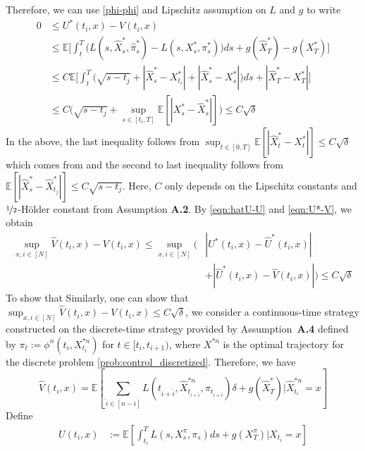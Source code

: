\documentclass{article}
\numberwithin{equation}{section}
\begin{document}
Therefore, we can use \eqref{phi-phi} and Lipschitz assumption on $L$ and $g$ to write
\begin{equation}\label{eqn:U*-V}
    \begin{split}
        0&\le {U}^*(t_{i},x) -V(t_{i},x)\\
        &\le \mathbb{E}\bigg[ \int_t^T \!\!\!\!\!\big(L(s,\hat{X}^*_{s},\hat{\pi}^*_s)-L(s,{X}^*_{s},{\pi}^*_s)\big)ds + g(\hat{X}_T^{*})- g({X}_T^{*})  \bigg] \\
        &\le C\mathbb{E}\bigg[ \int_t^T \big(\sqrt{s-t_j}+|\hat{X}^*_{s}-{X}^*_{t_i}|+|\hat{X}^*_{s}-{X}^*_{s}|\big)ds 
        + |\hat{X}_T^{*} - {X}_T^{*}|  \bigg]\\
        &\le C \big(\sqrt{s-t_j}+\sup_{s\in[t_i,T]}\mathbb{E}[|X^*_{s}-\hat{X}^*_{s}|]\big)\le C\sqrt{\delta}
    \end{split}
\end{equation}
In the above, the last inequality follows from $\sup_{t\in[0,T]}\mathbb{E}[|\hat{X}^*_{t}-{X}^*_{t}|]\le C\sqrt{\delta}$ which comes from \citet[Theorem~9.6.2]{KP13} and the second to last inequality follows from $\mathbb{E}[|\hat{X}^*_{s}-\hat{X}^*_{t_{j}}|]\le C\sqrt{s-t_j}$. 
Here, $C$ only depends on the Lipschitz constants and $\nicefrac{1}{2}$-Hölder constant from Assumption \textbf{A.2}. By \eqref{eqn:hatU-U} and \eqref{eqn:U*-V}, we obtain
\begin{equation}
    \begin{split}
        \sup_{x, i\in[N]}\hat{V}(t_{i},x)-{V}(t_{i},x)\le  \sup_{x, i\in[N]} \big(&|U^*(t_{i},x)-\hat{U}^*(t_{i},x)|\\
        &+|\hat{U}^*(t_{i},x)-\hat{V}(t_{i},x)|\big) \le C\sqrt{\delta}
    \end{split}
\end{equation}
To show that 
Similarly, one can show that $\sup_{x, i\in[N]}\hat{V}(t_{i},x)-{V}(t_{i},x)\le C\sqrt{\delta}$, we consider a continuous-time strategy constructed on the discrete-time strategy provided by Assumption~\textbf{A.4} defined by 
$\pi_t:=\phi^n(t_i,X^{*n}_{t_i})$ for $t\in[t_i,t_{i+1})$, where $X^{*n}$ is the optimal trajectory for the discrete problem \eqref{prob:control_discretized}. Therefore, we have 
\begin{equation}
    \hat{V}(t_i,x)=\mathbb{E}\left[\sum_{\hat{i}\in[n-i]}L(t_{i+\hat{i}},\hat{X}^{*n}_{t_{i+\hat{i}}},{\pi}_{t_{i+\hat{i}}})\delta + g(\hat{X}_T^{*})\bigg|\hat{X}^{*n}_{t_i}=x\right]
\end{equation}
Define
\begin{equation}
\begin{split}
    {U}(t_i,x)&:=\mathbb{E}\left[\int_{t_i}^T L(s,{X}^{\pi}_{s},{\pi}_s)ds + g({X}^{\pi}_T)\bigg|{X}_{t_i}=x\right]
\end{split}
\end{equation}
\end{document}
